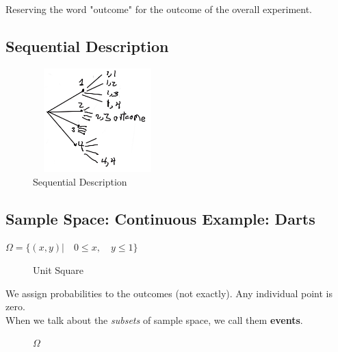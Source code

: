 Reserving the word "outcome" for the outcome of the overall experiment.

\subsection{Sequential Description}

\begin{figure}[ht]
\centering
\includegraphics[width=5cm, height=4cm]{images/L01/sequential_desc.jpeg}
\caption{Sequential Description}
\end{figure}

\subsection{Sample Space: Continuous Example: Darts}

$\Omega = \{(x,y) | \quad 0 \le x, \quad y \le 1 \}$

\begin{figure}[ht]
\centering
{}
\caption{Unit Square}
\end{figure}
We assign probabilities to the outcomes (not exactly).  Any individual point is zero.
\\
When we talk about the \textit{subsets} of sample space, we call them \textbf{events}.

\begin{figure}[ht]
\centering
\caption{$\Omega$} \label{fig:M1}
\end{figure}


